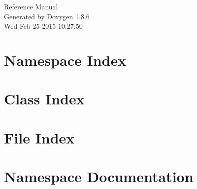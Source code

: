 \documentclass[twoside]{book}
\newcommand{\clearemptydoublepage}{%
  \newpage{\pagestyle{empty}\cleardoublepage}%
}
\begin{document}
\hypersetup{pageanchor=false}
\begin{titlepage}
\vspace*{7cm}
\begin{center}%
{\Large Reference Manual}\\
\vspace*{1cm}
{\large Generated by Doxygen 1.8.6}\\
\vspace*{0.5cm}
{\small Wed Feb 25 2015 10:27:50}\\
\end{center}
\end{titlepage}
\clearemptydoublepage
\tableofcontents
\clearemptydoublepage
{}
\hypersetup{pageanchor=true}

\chapter{Namespace Index}

\chapter{Class Index}

\chapter{File Index}

\chapter{Namespace Documentation}









































\end{document}
